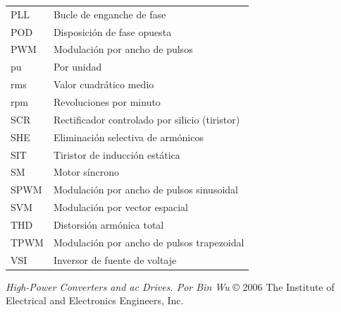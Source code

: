 \documentclass[letterpaper,12pt]{article}
\begin{document}
\begin{flushleft}
\begin{tabular}{ll}
PLL & Bucle de enganche de fase \\
POD & Disposición de fase opuesta \\
PWM & Modulación por ancho de pulsos \\
pu & Por unidad \\
rms & Valor cuadrático medio \\
rpm & Revoluciones por minuto \\
SCR & Rectificador controlado por silicio (tiristor) \\
SHE & Eliminación selectiva de armónicos \\
SIT & Tiristor de inducción estática \\
SM & Motor síncrono \\
SPWM & Modulación por ancho de pulsos sinusoidal \\
SVM & Modulación por vector espacial \\
THD & Distorsión armónica total \\
TPWM & Modulación por ancho de pulsos trapezoidal \\
VSI & Inversor de fuente de voltaje \\
\end{tabular}
\end{flushleft}
\normalsize

\begin{flushright}
\textit{High-Power Converters and ac Drives. Por Bin Wu}
\newline
© 2006 The Institute of Electrical and Electronics Engineers, Inc.
\end{flushright}
\end{document}
